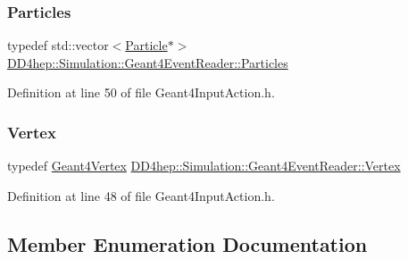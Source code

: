 \subsubsection{\texorpdfstring{Particles}{Particles}}
{\footnotesize\ttfamily typedef std\+::vector$<$\hyperlink{class_d_d4hep_1_1_simulation_1_1_geant4_event_reader_ad37f7aa722da2299517d66b4568a6a4a}{Particle}$\ast$$>$ \hyperlink{class_d_d4hep_1_1_simulation_1_1_geant4_event_reader_afa252e93d319aef2810a17aa78bb4603}{D\+D4hep\+::\+Simulation\+::\+Geant4\+Event\+Reader\+::\+Particles}}



Definition at line 50 of file Geant4\+Input\+Action.\+h.

\hypertarget{class_d_d4hep_1_1_simulation_1_1_geant4_event_reader_ac9738208fe520e5aa2ad1efa13de82e7}{}\label{class_d_d4hep_1_1_simulation_1_1_geant4_event_reader_ac9738208fe520e5aa2ad1efa13de82e7} 
\subsubsection{\texorpdfstring{Vertex}{Vertex}}
{\footnotesize\ttfamily typedef \hyperlink{class_d_d4hep_1_1_simulation_1_1_geant4_vertex}{Geant4\+Vertex} \hyperlink{class_d_d4hep_1_1_simulation_1_1_geant4_event_reader_ac9738208fe520e5aa2ad1efa13de82e7}{D\+D4hep\+::\+Simulation\+::\+Geant4\+Event\+Reader\+::\+Vertex}}



Definition at line 48 of file Geant4\+Input\+Action.\+h.



\subsection{Member Enumeration Documentation}
\hypertarget{class_d_d4hep_1_1_simulation_1_1_geant4_event_reader_ae4f4bc83ffcf5b0c1868ad78859851e7}{}\label{class_d_d4hep_1_1_simulation_1_1_geant4_event_reader_ae4f4bc83ffcf5b0c1868ad78859851e7} 
